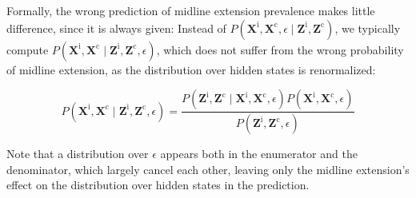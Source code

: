 \documentclass[
  sn-mathphys-num,
]{sn-jnl}
\begin{document}
Formally, the wrong prediction of midline extension prevalence makes
little difference, since it is always given: Instead of
\(P\left( \mathbf{X}^\text{i}, \mathbf{X}^\text{c}, \epsilon \mid \mathbf{Z}^\text{i}, \mathbf{Z}^\text{c} \right)\),
we typically compute
\(P\left( \mathbf{X}^\text{i}, \mathbf{X}^\text{c} \mid \mathbf{Z}^\text{i}, \mathbf{Z}^\text{c}, \epsilon \right)\),
which does not suffer from the wrong probability of midline extension,
as the distribution over hidden states is renormalized:

\[
P \left( \mathbf{X}^\text{i}, \mathbf{X}^\text{c} \mid \mathbf{Z}^\text{i}, \mathbf{Z}^\text{c}, \epsilon \right) = \frac{P \left( \mathbf{Z}^\text{i}, \mathbf{Z}^\text{c} \mid \mathbf{X}^\text{i}, \mathbf{X}^\text{c}, \epsilon \right) P \left( \mathbf{X}^\text{i}, \mathbf{X}^\text{c}, \epsilon \right)}{P \left( \mathbf{Z}^\text{i}, \mathbf{Z}^\text{c}, \epsilon \right)}
\]

Note that a distribution over \(\epsilon\) appears both in the
enumerator and the denominator, which largely cancel each other, leaving
only the midline extension's effect on the distribution over hidden
states in the prediction.


\end{document}
